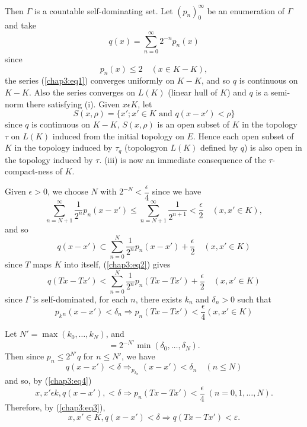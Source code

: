 Then $\Gamma$ is a countable self-dominating set. Let
$(p_n)^\infty_0$ be an enumeration of $\Gamma$ and take 
\begin{equation*}
 q(x)=\sum^\infty_{n=0}2^{-n} p_n (x) \tag{1}\label{chap3:eq1}
\end{equation*}
since
$$
p_n(x)\leq 2 \quad(x \in K-K),
$$
the series (\ref{chap3:eq1}) converges uniformly on $K-K$, and so $q$ is
continuous on $K-K$. Also the series converges on $L(K)$ (linear hull
of $K$) and $q$ is a semi-norm there satisfying (i). Given $x \epsilon K$,
let 
$$
S(x,\rho)=\{x'; x' \in K \text { and }q(x-x')<\rho\}
$$
since $q$ is continuous on $K-K$, $S(x,\rho)$ is an open subset of $K$ in
the topology $\tau$ on $L(K)$ induced from the initial topology on
$E$. Hence each open subset of $K$ in the topology induced by $\tau_q$
(topology\pageoriginale on $L(K)$ defined by $q$) is also open in the
topology induced by $\tau$. (iii) is now an immediate consequence of
the $\tau$-compact-ness of $K$.  

Given $\epsilon > 0$, we choose $N$ with $2^{-N}<\dfrac{\epsilon}{4}$ since
we have  
$$
\sum^\infty_{n=N+1}\frac{1}{2^n}p_n(x-x')\leq
\sum^\infty_{n=N+1}\frac{1}{2^{n+1}}<\frac{\epsilon}{2}\quad(x,x' \in K),
$$
and so
\begin{equation*}
q(x-x') \subset \sum^N_{n=0}\frac{1}{2^n}p_n(x-x')+\frac{\epsilon}{2} 
\quad (x,x' \in K) \tag{2}\label{chap3:eq2}
 \end{equation*}
since $T$ maps $K$ into itself, (\ref{chap3:eq2}) gives
\begin{equation}
  q(Tx-Tx')<\sum^N_{n=0} \frac{1}{2^n} p_n(Tx-Tx') + \frac{\epsilon}{2}\quad
  (x,x'\in K) \tag{3}\label{chap3:eq3} 
\end{equation}
since $\Gamma$ is self-dominated, for each $n$, there exists $k_n$ and
$\delta_n > 0$ such that 
\begin{equation*}
  p_k{_{n}}(x-x')<\delta_n \Rightarrow p_n(Tx-Tx') <
  \frac{\epsilon}{4}(x,x' 
  \in K)\tag{4}\label{chap3:eq4} 
\end{equation*}

Let $N' = \max (k_0, \ldots, k_N)$, and
$$
=2^{-N'} \min (\delta_0,\ldots, \delta_N).
$$
Then since $ p_n \leq 2^{N'}q$ for $n \leq N'$, we have
$$ 
q(x-x')< \delta \Rightarrow_{p_{k_n}}(x-x')<\delta_n \quad (n\leq N) 
$$
and so, by (\ref{chap3:eq4})
$$
x, x' \epsilon k, q(x-x'), < \delta \Rightarrow p_n (Tx-Tx') <
\frac{\epsilon}{4} \; (n=0, 1, \ldots , N). 
$$\pageoriginale
Therefore, by (\ref{chap3:eq3}),
$$
x, x' \in K, q(x-x') < \delta \Rightarrow q(Tx-Tx') < \varepsilon.
$$

